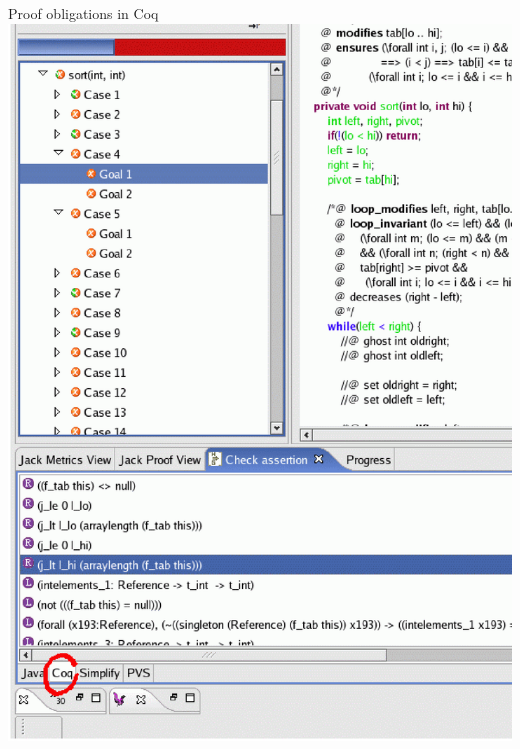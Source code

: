 \documentclass[final,nocolorBG,a4,mobius,nototal,pdf,slideColor]{prosper}
\begin{document}
\begin{slide}{Proof obligations in Coq}
\vspace*{-1.5em}
\includegraphics[height=\textheight]{screen7.ps}
\end{slide}
\end{document}
